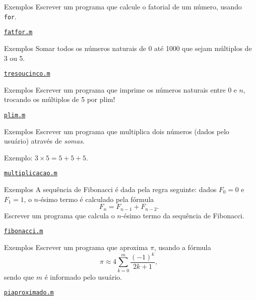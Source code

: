 \documentclass[hyperref={pdfpagelabels=false}]{beamer}
\begin{document}
\begin{frame}{Exemplos}
  Escrever um programa que calcule o fatorial de um número, usando {\texttt{for}}.
  \vfill
  \begin{center} \href{listings/fatfor.m}{\underline{\texttt{fatfor.m}}} \end{center}
\end{frame}

\begin{frame}{Exemplos}
  Somar todos os números naturais de 0 até 1000 que sejam múltiplos de 3 ou 5.
  \vfill
  \begin{center} \href{listings/tresoucinco.m}{\underline{\texttt{tresoucinco.m}}} \end{center}
\end{frame}

\begin{frame}{Exemplos}
  Escrever um programa que imprime os números naturais entre 0 e $n$, trocando os múltiplos de 5 por \alert{plim!}
  \vfill
  \begin{center} \href{listings/plim.m}{\underline{\texttt{plim.m}}} \end{center}
\end{frame}

\begin{frame}{Exemplos}
  Escrever um programa que multiplica dois números (dados pelo usuário) através de \emph{somas}.
   
  Exemplo: $3\times 5 = 5+5+5$.
  \vfill
  \begin{center} \href{listings/multiplicacao.m}{\underline{\texttt{multiplicacao.m}}} \end{center}
\end{frame}

\begin{frame}{Exemplos}
	A sequência de Fibonacci é dada pela regra seguinte: dados $F_0 = 0$ e $F_1 = 1$, o $n$-ésimo termo é calculado pela fórmula
	$$F_n = F_{n-1} + F_{n-2}.$$
	Escrever um programa que calcula o $n$-ésimo termo da sequência de Fibonacci.
	\vfill
  \begin{center} \href{listings/fibonacci.m}{\underline{\texttt{fibonacci.m}}} \end{center}
\end{frame}

\begin{frame}{Exemplos}
	Escrever um programa que aproxima $\pi$, usando a fórmula
	$$\pi \approx 4\sum_{k=0}^m \frac{(-1)^k}{2k+1},$$
	sendo que $m$ é informado pelo usuário.
	\vfill
  \begin{center} \href{listings/piaproximado.m}{\underline{\texttt{piaproximado.m}}} \end{center}
\end{frame}
\end{document}
